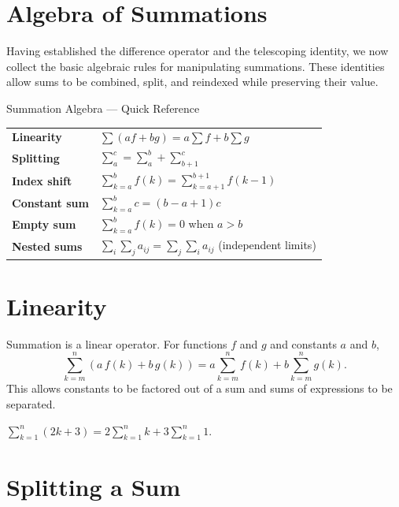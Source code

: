 
\section{Algebra of Summations}
\label{sec:summation-algebra}

Having established the difference operator and the telescoping identity,
we now collect the basic algebraic rules for manipulating summations.
These identities allow sums to be combined, split, and reindexed while
preserving their value.

\begin{toolkitbox}{Summation Algebra — Quick Reference}
\renewcommand{\arraystretch}{1.5}
\begin{tabular}{@{}ll@{}}
\textbf{Linearity} & $\sum(af+bg) = a\sum f + b\sum g$ \\
\textbf{Splitting} & $\sum_a^c = \sum_a^b + \sum_{b+1}^c$ \\
\textbf{Index shift} & $\sum_{k=a}^{b} f(k) = \sum_{k=a+1}^{b+1} f(k-1)$ \\
\textbf{Constant sum} & $\sum_{k=a}^{b} c = (b-a+1)c$ \\
\textbf{Empty sum} & $\sum_{k=a}^{b} f(k) = 0$ when $a > b$ \\
\textbf{Nested sums} & $\sum_i\sum_j a_{ij} = \sum_j\sum_i a_{ij}$ (independent limits) \\
\end{tabular}
\end{toolkitbox}

\section*{Linearity}

Summation is a linear operator. For functions \(f\) and \(g\) and
constants \(a\) and \(b\),
\[
\sum_{k=m}^{n} (a\,f(k) + b\,g(k))
=
a \sum_{k=m}^{n} f(k)
+
b \sum_{k=m}^{n} g(k).
\]
This allows constants to be factored out of a sum and sums of expressions
to be separated.

\begin{example*}
\(\displaystyle\sum_{k=1}^{n} (2k + 3)
= 2\sum_{k=1}^{n} k + 3\sum_{k=1}^{n} 1.\)
\end{example*}

\section*{Splitting a Sum}

